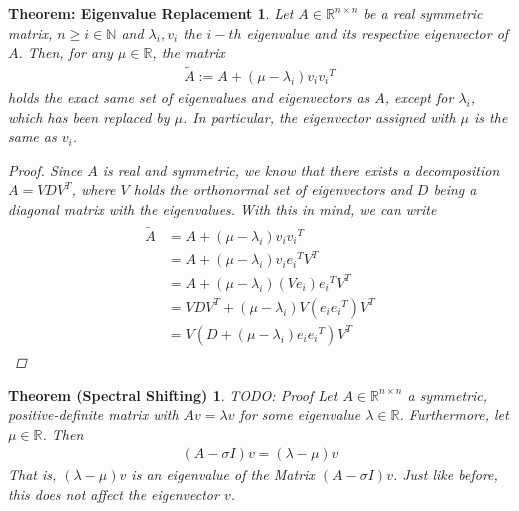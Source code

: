 \documentclass[10pt, a4paper, twocolumn]{article} %
\begin{document}
    \newtheorem{eigenvalueReplacement}[]{Theorem: Eigenvalue Replacement}[section]
    \begin{eigenvalueReplacement}
        Let $A \in \mathbb{R}^{n \times n}$ be a real symmetric matrix, $n \geq i \in \mathbb{N}$ and $\lambda_i, v_i$
        the $i-th$ eigenvalue and its respective eigenvector of $A$. Then, for any $\mu \in \mathbb{R}$, the matrix
        \begin{align}
            \tilde{A} := A + \left(\mu - \lambda_i \right) v_i {v_i}^T
        \end{align}
        holds the exact same set of eigenvalues and eigenvectors as $A$, except for $\lambda_i$, which has been replaced by $\mu$.
        In particular, the eigenvector assigned with $\mu$ is the same as $v_i$.
        \begin{proof}[Proof]
            Since $A$ is real and symmetric, we know that there exists a decomposition $A=VDV^T$, where $V$ holds the orthonormal
            set of eigenvectors and $D$ being a diagonal matrix with the eigenvalues. With this in mind, we can write
            \begin{align}
                \begin{split}
                    \tilde{A} & = A + \left( \mu - \lambda_i \right) v_i {v_i}^T \\
                    & = A + \left( \mu - \lambda_i \right) v_i {e_i}^T V^T \\
                    & = A + \left( \mu - \lambda_i \right) \left( V e_i \right) {e_i}^T V^T \\
                    & = VDV^T + \left( \mu - \lambda_i \right) V \left( e_i {e_i}^T \right) V^T \\
                    & = V\left( D + \left( \mu - \lambda_i \right) e_i {e_i}^T \right) V^T
                \end{split}
            \end{align}
        \end{proof}
    \end{eigenvalueReplacement}

    \newtheorem{Spectral Shifting}[]{Theorem (Spectral Shifting)}[section]
    \begin{Spectral Shifting}
        TODO: Proof
        Let $A \in \mathbb{R}^{n \times n}$ a symmetric, positive-definite matrix with $Av=\lambda v$ for some eigenvalue $\lambda \in \mathbb{R}$.
        Furthermore, let $\mu \in \mathbb{R}$. Then
        \begin{align}
            (A - \sigma I)v = (\lambda - \mu)v
        \end{align}
        That is, $(\lambda - \mu)v$ is an eigenvalue of the Matrix $(A - \sigma I)v$. Just like before, this does not affect the
        eigenvector $v$.
    \end{Spectral Shifting}
\end{document}
